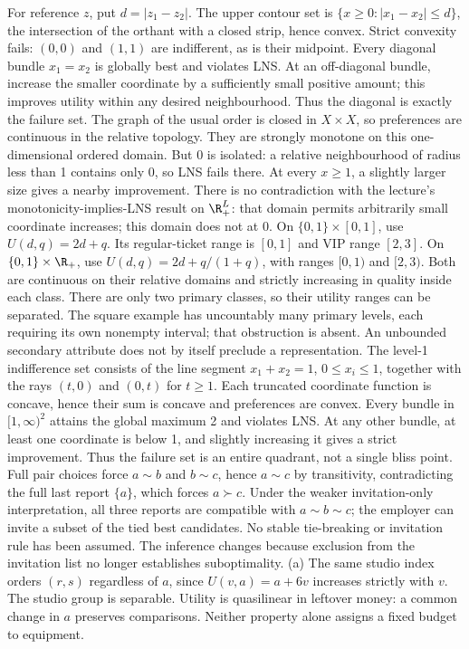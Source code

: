 \documentclass[11pt,a4paper]{article}
\begin{document}
For reference $z$, put $d=|z_1-z_2|$. The upper contour set is $\{x\ge0:|x_1-x_2|\le d\}$, the intersection of the orthant with a closed strip, hence convex. Strict convexity fails: $(0,0)$ and $(1,1)$ are indifferent, as is their midpoint. Every diagonal bundle $x_1=x_2$ is globally best and violates LNS. At an off-diagonal bundle, increase the smaller coordinate by a sufficiently small positive amount; this improves utility within any desired neighbourhood. Thus the diagonal is exactly the failure set.
The graph of the usual order is closed in $X\times X$, so preferences are continuous in the relative topology. They are strongly monotone on this one-dimensional ordered domain. But 0 is isolated: a relative neighbourhood of radius less than 1 contains only 0, so LNS fails there. At every $x\ge1$, a slightly larger size gives a nearby improvement. There is no contradiction with the lecture's monotonicity-implies-LNS result on $\R_+^L$: that domain permits arbitrarily small coordinate increases; this domain does not at 0.
On $\{0,1\}\times[0,1]$, use $U(d,q)=2d+q$. Its regular-ticket range is $[0,1]$ and VIP range $[2,3]$. On $\{0,1\}\times\R_+$, use $U(d,q)=2d+q/(1+q)$, with ranges $[0,1)$ and $[2,3)$. Both are continuous on their relative domains and strictly increasing in quality inside each class. There are only two primary classes, so their utility ranges can be separated. The square example has uncountably many primary levels, each requiring its own nonempty interval; that obstruction is absent. An unbounded secondary attribute does not by itself preclude a representation.
The level-1 indifference set consists of the line segment $x_1+x_2=1$, $0\le x_i\le1$, together with the rays $(t,0)$ and $(0,t)$ for $t\ge1$. Each truncated coordinate function is concave, hence their sum is concave and preferences are convex. Every bundle in $[1,\infty)^2$ attains the global maximum 2 and violates LNS. At any other bundle, at least one coordinate is below 1, and slightly increasing it gives a strict improvement. Thus the failure set is an entire quadrant, not a single bliss point.
Full pair choices force $a\sim b$ and $b\sim c$, hence $a\sim c$ by transitivity, contradicting the full last report $\{a\}$, which forces $a\succ c$. Under the weaker invitation-only interpretation, all three reports are compatible with $a\sim b\sim c$; the employer can invite a subset of the tied best candidates. No stable tie-breaking or invitation rule has been assumed. The inference changes because exclusion from the invitation list no longer establishes suboptimality.
(a) The same studio index orders $(r,s)$ regardless of $a$, since $U(v,a)=a+6v$ increases strictly with $v$. The studio group is separable. Utility is quasilinear in leftover money: a common change in $a$ preserves comparisons. Neither property alone assigns a fixed budget to equipment.
\end{document}
